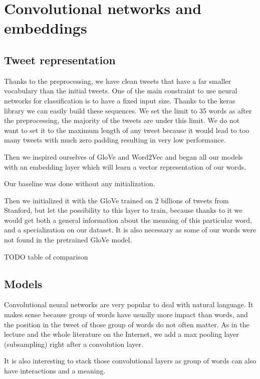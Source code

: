 \documentclass[10pt,conference,compsocconf]{IEEEtran}
\begin{document}
\section{Convolutional networks and embeddings}

\subsection{Tweet representation}

Thanks to the preprocessing, we have clean tweets that have a far smaller vocabulary than the initial tweets. One of the main constraint to use neural networks for classification is to have a fixed input size. Thanks to the keras library we can easily build these sequences. We set the limit to 35 words as after the preprocessing, the majority of the tweets are under this limit. We do not want to set it to the maximum length of any tweet because it would lead to too many tweets with much zero padding resulting in very low performance.

Then we inspired ourselves of GloVe and Word2Vec and began all our models with an embedding layer which will learn a vector representation of our words.

Our baseline was done without any initialization.

Then we initialized it with the GloVe trained on 2 billions of tweets from Stanford, but let the possibility to this layer to train, because thanks to it we would get both a general information about the meaning of this particular word, and a specialization on our dataset. It is also necessary as some of our words were not found in the pretrained GloVe model.

TODO table of comparison

\subsection{Models}

Convolutional neural networks are very popular to deal with natural language. It makes sense because group of words have usually more impact than words, and the position in the tweet of those group of words do not often matter.
As in the lecture and the whole literature on the Internet, we add a max pooling layer (subsampling) right after a convolution layer.

It is also interesting to stack those convolutional layers as group of words can also have interactions and a meaning.
\end{document}
